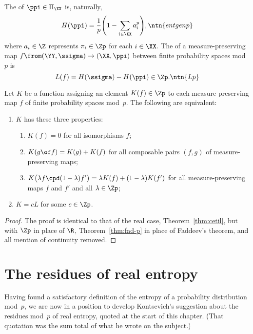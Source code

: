 The %
%
% 
of $\ppi \in \Pi_\XX$ is, naturally, 
\[
H(\ppi) = \frac{1}{p} \Biggl( 1 - \sum_{i \in \XX} a_i^p \Biggr),
\ntn{entgenp}
\]
where $a_i \in \Z$ represents $\pi_i \in \Zp$ for each $i \in \XX$.  The
%
%
% 
of a measure-preserving map $f \from (\YY, \ssigma)
\to (\XX, \ppi)$ between finite probability spaces mod~$p$ is
\[
L(f) = H(\ssigma) - H(\ppi) \in \Zp.
\ntn{Lp}
\]

\begin{thm}
% 
Let $K$ be a function assigning an element $K(f) \in \Zp$ to each
measure-preserving map $f$ of finite probability spaces mod~$p$.  The
following are equivalent:
% 
\begin{enumerate}
\item 
{}
$K$ has these three properties:
% 
\begin{enumerate}
\item 
$K(f) = 0$ for all isomorphisms $f$;

\item
$K(g \of f) = K(g) + K(f)$ for all composable pairs $(f, g)$ of
  measure-preserving maps;

\item
$K\bigl(\lambda f \cpd (1 - \lambda) f'\bigr) = \lambda K(f) + (1 -
  \lambda) K(f')$ for all measure-preserving maps $f$ and $f'$ and all
  $\lambda \in \Zp$;
\end{enumerate}

\item
{}
$K = cL$ for some $c \in \Zp$.
\end{enumerate}
\end{thm}

\begin{proof}
The proof is identical to that of the real case, Theorem~\ref{thm:cetil},
but with $\Zp$ in place of $\R$, Theorem~\ref{thm:fad-p} in place of
Faddeev's theorem, and all mention of continuity removed.
\end{proof}


\section{The residues of real entropy}


Having found a satisfactory definition of the entropy of a probability
distribution mod~$p$, we are now in a position to develop 
Kontsevich's%
%
%
suggestion about the residues mod~$p$ of real entropy, quoted at the start of
this chapter.  (That quotation was the sum total of what he wrote on the
subject.)

